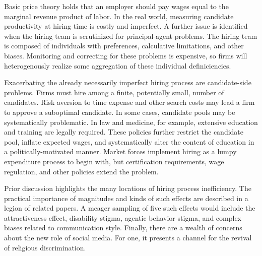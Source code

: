 \documentclass[review]{elsarticle}
\begin{document}
Basic price theory holds that an employer should pay wages equal to the marginal revenue product of labor.
In the real world, measuring candidate productivity at hiring time is costly and imperfect.
A further issue is identified when the hiring team is scrutinized for principal-agent problems.
The hiring team is composed of individuals with preferences, calculative limitations, and other biases.
Monitoring and correcting for these problems is expensive,
so firms will heterogenously realize some aggregation of these individual definiciencies.

Exacerbating the already necessarily imperfect hiring process are candidate-side problems.
Firms must hire among a finite, potentially small, number of candidates.
Risk aversion to time expense and other search costs may lead a firm to approve a suboptimal candidate\cite{simon1976substantive}.
In some cases, candidate pools may be systematically problematic.
In law and medicine, for example, extensive education and training are legally required.
These policies further restrict the candidate pool, inflate expected wages, and systematically alter the content of education in a politically-motivated manner.
Market forces implement hiring as a lumpy expenditure process to begin with, but certification requirements, wage regulation, and other policies extend the problem.

Prior discussion highlights the many locations of hiring process inefficiency.
The practical importance of magnitudes and kinds of such effects are described in a legion of related papers.
A meager sampling of five such effects would include the attractiveness effect,
disability stigma,
agentic behavior stigma,
and complex biases related to communication style.
Finally, there are a wealth of concerns about the new role of social media.
For one, it presents a channel for the revival of religious discrimination.


%
% 
%
\end{document}
